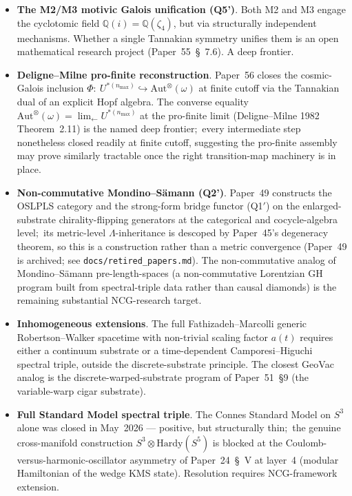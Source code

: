 \documentclass[11pt,a4paper]{article}
\newcommand{\sthree}{S^{3}}
\newcommand{\sfive}{S^{5}}
\newcommand{\Q}{\mathbb{Q}}
\begin{document}
\begin{itemize}
    multi-focal-composition rather than a missing single mechanism.
  \item \textbf{The M2/M3 motivic Galois unification (Q5')}.  Both M2 and
    M3 engage the cyclotomic field $\Q(i) = \Q(\zeta_4)$, but via
    structurally independent mechanisms.  Whether a single Tannakian
    symmetry unifies them is an open mathematical research project
    (Paper~55~\S~7.6).  A deep frontier.
  \item \textbf{Deligne--Milne pro-finite reconstruction}.
    Paper~56 closes the cosmic-Galois inclusion $\Phi:\
    U^{*(n_{\max})} \hookrightarrow \mathrm{Aut}^\otimes(\omega)$ at
    finite cutoff via the Tannakian dual of an explicit Hopf algebra.
    The converse equality $\mathrm{Aut}^\otimes(\omega) =
    \lim_\leftarrow U^{*(n_{\max})}$ at the pro-finite limit
    (Deligne--Milne 1982 Theorem~2.11) is the named deep
    frontier;\ every intermediate step nonetheless closed readily at
    finite cutoff, suggesting the pro-finite assembly may prove
    similarly tractable once the right transition-map machinery
    is in place.
  \item \textbf{Non-commutative Mondino--S\"amann (Q2')}.  Paper~49
    constructs the OSLPLS category and the strong-form bridge functor
    (Q1$'$) on the enlarged-substrate chirality-flipping generators at the
    categorical and cocycle-algebra level;\ its metric-level
    $\Lambda$-inheritance is descoped by Paper~45's degeneracy theorem, so
    this is a construction rather than a metric convergence (Paper~49 is
    archived; see \texttt{docs/retired\_papers.md}).  The non-commutative
    analog of
    Mondino--S\"amann pre-length-spaces (a non-commutative Lorentzian
    GH program built from spectral-triple data rather than causal
    diamonds) is the remaining substantial NCG-research target.
  \item \textbf{Inhomogeneous extensions}.  The full
    Fathizadeh--Marcolli generic Robertson--Walker spacetime with
    non-trivial scaling factor $a(t)$ requires either a continuum
    substrate or a time-dependent Camporesi--Higuchi spectral triple,
    outside the discrete-substrate principle.  The closest GeoVac
    analog is the discrete-warped-substrate program of
    Paper~51~\S9 (the variable-warp cigar substrate).
  \item \textbf{Full Standard Model spectral triple}.  The Connes
    Standard Model on $\sthree$ alone was closed in May~2026 ---
    positive, but structurally thin;\ the genuine cross-manifold
    construction $\sthree \otimes \mathrm{Hardy}(\sfive)$ is blocked
    at the Coulomb-versus-harmonic-oscillator asymmetry of
    Paper~24~\S~V at layer~4 (modular Hamiltonian of the wedge KMS
    state).  Resolution requires NCG-framework extension.
\end{itemize}
\end{document}
